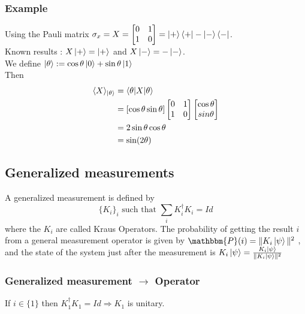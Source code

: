\documentclass{article}
\begin{document}
\subsubsection*{Example}
Using the Pauli matrix $\sigma_x = X =
    \begin{bmatrix}
    0 & 1 \\
    1 & 0
    \end{bmatrix}
    = \ket{+}\bra{+} - \ket{-}\bra{-} $. \\\noindent Known results : $X\ket{+} =
    \ket{+}$ and $X\ket{-}=-\ket{-}$. \\\noindent We define
    $\ket{\theta}:=\cos\theta\ket{0}+\sin\theta\ket{1}$ \\\noindent Then
\begin{equation}
    \begin{aligned}
        \langle X \rangle_{\ket{\theta}}
            & = \braket{\theta | X |\theta} \\
            & = [\cos \theta \sin \theta]
                \begin{bmatrix}0 & 1 \\ 1 & 0 \end{bmatrix}
                \begin{bmatrix} \cos \theta\\ sin \theta \end{bmatrix} \\
            & = 2 \sin\theta\cos\theta \\
            & = \sin (2\theta)
    \end{aligned}
\end{equation}


\subsection{Generalized measurements}
A generalized measurement is defined by
\begin{equation}
    \{K_i\}_i \text{ such that } \sum_i K_i^\dagger K_i=Id
\end{equation}
where the $K_i$ are called Kraus Operators. The probability of getting the
result $i$ from a general measurement operator is given by $\mathbbm{P}(i) =
\|K_i\ket{\psi}\|^2$ , and the state of the system just after the measurement is
$K_i\ket{\psi}=\frac{K_i\ket{\psi}}{\|K_i\ket{\psi}\|^2}$

\subsubsection*{Generalized measurement $\rightarrow$ Operator}
If $i \in \{1\}$ then $K_1^\dagger K_1=Id \Rightarrow K_1$ is
unitary.%
\end{document}
